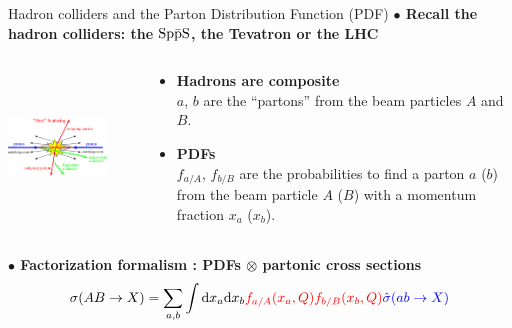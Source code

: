 \documentclass[aspectratio=169]{beamer}
\begin{document}
\begin{frame}{Hadron colliders and the Parton Distribution Function (PDF) }
	\vspace{2mm}  \textcolor{PittRoyal}{\bf $\bullet$ Recall the hadron colliders: the ${\rm Sp{\bar p}S}$, the Tevatron or the LHC}
	\begin{columns}
		\begin{column}{0.6\textwidth}
			\begin{center}
				\includegraphics[width=0.8\textwidth,height=4cm]{figs/hardscattering1-hepph}
			\end{center}	
		\end{column}
		\begin{column}{0.4\textwidth}
			\begin{itemize}
				\item {\bf Hadrons are composite}\\ $a$, $b$ are the ``partons'' from the beam particles $A$ and $B$.
				\item {\bf PDFs}\\
				$f_{a/A}$, $f_{b/B}$ are the probabilities to find a parton $a$ ($b$) from the beam particle $A$ ($B$) with a momentum fraction $x_a$ ($x_b$).
			\end{itemize}
		\end{column}
	\end{columns}

	\textcolor{PittRoyal}{\bf$\bullet$ Factorization formalism : PDFs $\otimes$ partonic cross sections}
	\begin{eqnarray}
		\sigma(AB\to X)=\sum_{a,b} \int\dd x_{a}\dd x_{b} \textcolor{red}{f_{a/A}(x_{a},Q) f_{b/B}(x_{b},Q)} \textcolor{blue}{ \hat{\sigma}(ab\to X)}\nonumber
	\end{eqnarray}
\end{frame}
\end{document}
